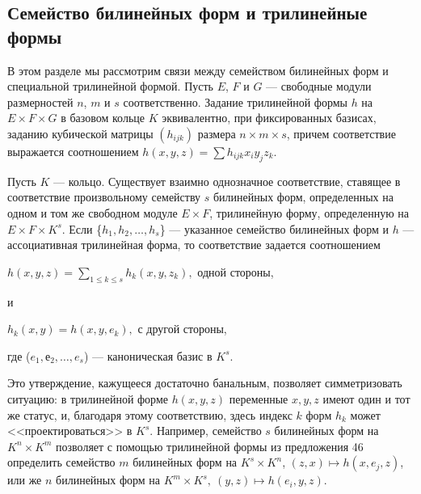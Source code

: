 \documentclass{mai_book}
\begin{document}
\subsection{Семейство билинейных форм и трилинейные формы}
В этом разделе мы рассмотрим связи между семейством билинейных форм и специальной трилинейной формой. Пусть $E$, $F$ и $G$ --- свободные модули размерностей $n$, $m$ и $s$ соответственно. Задание трилинейной формы $h$ на $E \times F \times G$ в базовом кольце $K$ эквивалентно, при фиксированных базисах, заданию кубической матрицы $(h_{ijk})$ размера $n \times m \times s$, причем соответствие выражается соотношением $h(x,y,z)= \sum h_{ijk}x_iy_jz_k$.
\begin{predl}
  Пусть $K$ — кольцо. Существует взаимно однозначное соответствие, ставящее в соответствие произвольному семейству $s$ билинейных форм, определенных на одном и том же свободном модуле $E \times F$, трилинейную форму, определенную на $E \times F \times K^s$. Если \{$h_1,h_2,\ldots,h_s$\} --- указанное семейство билинейных форм и $h$ --- ассоциативная трилинейная форма, то соответствие задается соотношением
  \begin{center}
    $h(x,y,z)= \sum_{1 \leqslant k \leqslant s}h_k(x,y,z_k),$ одной стороны,\par
    и\par
    $h_k(x,y)=h(x,y,e_k),$ с другой стороны,
  \end{center}
  \noindent
  где ($e_1,е_2,\ldots,e_s$) --- каноническая базис в $K^s$.
\end{predl}
Это утверждение, кажущееся достаточно банальным, позволяет симметризовать ситуацию: в трилинейной форме $h(x,y,z)$ переменные $x,y,z$ имеют один и тот же статус, и, благодаря этому соответствию, здесь индекс $k$ форм $h_k$ может <<проектироваться>> в $K^s$. Например, семейство $s$ билинейных форм на $K^n \times K^m$ позволяет с помощью трилинейной формы из предложения 46 определить семейство $m$ билинейных форм на $K^s \times K^n$, $(z,x) \mapsto h(x,e_j,z)$, или же $n$ билинейных форм на $K^m \times K^s,\ (y,z) \mapsto h(e_i,y,z)$.
\end{document}
